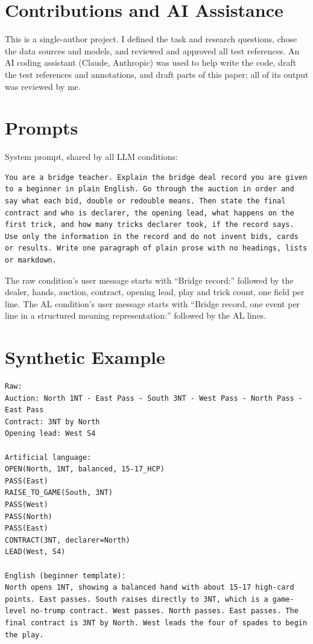 \documentclass[11pt]{article}
\begin{document}
\section*{Contributions and AI Assistance}

This is a single-author project. I defined the task and research questions, chose the data sources and models, and reviewed and approved all test references. An AI coding assistant (Claude, Anthropic) was used to help write the code, draft the test references and annotations, and draft parts of this paper; all of its output was reviewed by me.



\appendix

\section{Prompts}
\label{app:prompts}

System prompt, shared by all LLM conditions:

\begin{lstlisting}[style=bridgecode]
You are a bridge teacher. Explain the bridge deal record you are given to a beginner in plain English. Go through the auction in order and say what each bid, double or redouble means. Then state the final contract and who is declarer, the opening lead, what happens on the first trick, and how many tricks declarer took, if the record says. Use only the information in the record and do not invent bids, cards or results. Write one paragraph of plain prose with no headings, lists or markdown.
\end{lstlisting}

The raw condition's user message starts with ``Bridge record:'' followed by the dealer, hands, auction, contract, opening lead, play and trick count, one field per line. The AL condition's user message starts with ``Bridge record, one event per line in a structured meaning representation:'' followed by the AL lines.

\section{Synthetic Example}

\begin{lstlisting}[style=bridgecode]
Raw:
Auction: North 1NT - East Pass - South 3NT - West Pass - North Pass - East Pass
Contract: 3NT by North
Opening lead: West S4

Artificial language:
OPEN(North, 1NT, balanced, 15-17_HCP)
PASS(East)
RAISE_TO_GAME(South, 3NT)
PASS(West)
PASS(North)
PASS(East)
CONTRACT(3NT, declarer=North)
LEAD(West, S4)

English (beginner template):
North opens 1NT, showing a balanced hand with about 15-17 high-card points. East passes. South raises directly to 3NT, which is a game-level no-trump contract. West passes. North passes. East passes. The final contract is 3NT by North. West leads the four of spades to begin the play.
\end{lstlisting}
\end{document}
